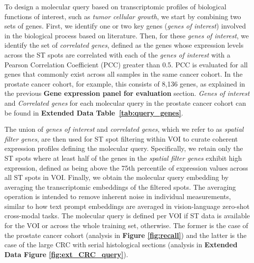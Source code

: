 
To design a molecular query based on transcriptomic profiles of biological functions of interest, such as \textit{tumor cellular growth}, we start by combining two sets of genes. First, we identify one or two key genes (\textit{genes of interest}) involved in the biological process based on literature. Then, for these \textit{genes of interest}, we identify the set of  \textit{correlated genes}, defined as the genes whose expression levels across the ST spots are correlated with each of the \textit{genes of interest} with a Pearson Correlation Coefficient (PCC) greater than 0.5. PCC is evaluated for all genes that commonly exist across all samples in the same cancer cohort. In the prostate cancer cohort, for example, this consists of 8,136 genes, as explained in the previous  \textbf{Gene expression panel for evaluation} section. \textit{Genes of interest} and \textit{Correlated genes} for each molecular query in the prostate cancer cohort can be found in \textbf{Extended Data Table~\ref{tab:query_genes}}.

The union of \textit{genes of interest} and \textit{correlated genes}, which we refer to as \textit{spatial filter genes}, are then used for ST spot filtering within VOI to curate coherent expression profiles defining the molecular query. Specifically, we retain only the ST spots where at least half of the genes in the \textit{spatial filter genes} exhibit high expression, defined as being above the 75th percentile of expression values across all ST spots in VOI. Finally, we obtain the molecular query embedding by averaging the transcriptomic embeddings of the filtered spots.
The averaging operation is intended to remove inherent noise in individual measurements, similar to how text prompt embeddings are averaged in vision-language zero-shot cross-modal tasks\cite{radford2021learning, lu2024visual, ding2024multimodalslidefoundationmodel}. 
The molecular query is defined per VOI if ST data is available for the VOI or across the whole training set, otherwise. The former is the case of the prostate cancer cohort (analysis in \textbf{Figure \ref{fig:recall}}) and the latter is the case of the large CRC with serial histological sections (analysis in \textbf{Extended Data Figure \ref{fig:ext_CRC_query}}).

